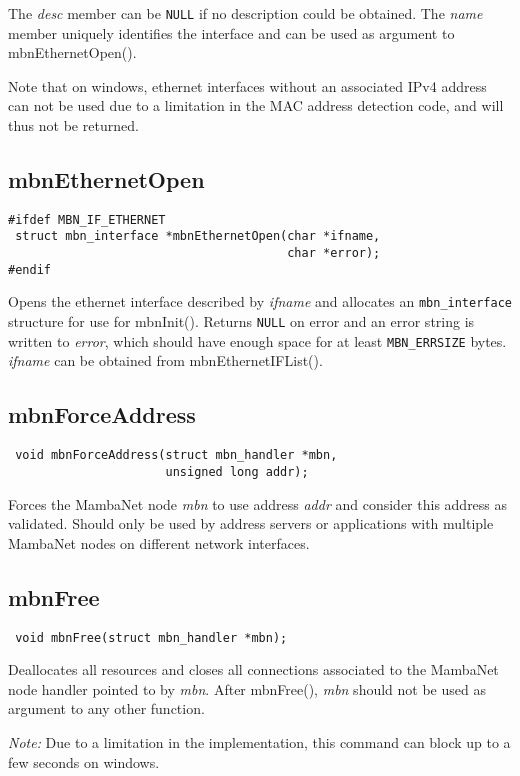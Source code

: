 \documentclass[a4paper]{report}
\begin{document}
The \textit{desc} member can be \verb|NULL| if no description could be obtained. The \textit{name} member uniquely identifies the interface and can be used as argument to mbnEthernetOpen().

Note that on windows, ethernet interfaces without an associated IPv4 address can not be used due to a limitation in the MAC address detection code, and will thus not be returned.


\subsection{mbnEthernetOpen}
\begin{verbatim}
#ifdef MBN_IF_ETHERNET
 struct mbn_interface *mbnEthernetOpen(char *ifname,
                                       char *error);
#endif
\end{verbatim}
Opens the ethernet interface described by \textit{ifname} and allocates an \verb|mbn_interface| structure for use for mbnInit(). Returns \verb|NULL| on error and an error string is written to \textit{error}, which should have enough space for at least \verb|MBN_ERRSIZE| bytes. \textit{ifname} can be obtained from mbnEthernetIFList().


\subsection{mbnForceAddress}
\begin{verbatim}
 void mbnForceAddress(struct mbn_handler *mbn,
                      unsigned long addr);
\end{verbatim}
Forces the MambaNet node \textit{mbn} to use address \textit{addr} and consider this address as validated. Should only be used by address servers or applications with multiple MambaNet nodes on different network interfaces.


\subsection{mbnFree}
\begin{verbatim}
 void mbnFree(struct mbn_handler *mbn);
\end{verbatim}
Deallocates all resources and closes all connections associated to the MambaNet node handler pointed to by \textit{mbn}. After mbnFree(), \textit{mbn} should not be used as argument to any other function.

\emph{Note:} Due to a limitation in the implementation, this command can block up to a few seconds on windows.
\end{document}
